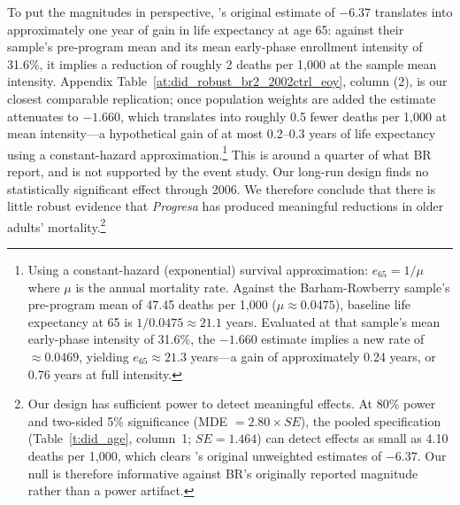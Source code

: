 \documentclass[12pt]{article}
\begin{document}
\p To put the magnitudes in perspective, \cite{BarhamRowberry2013JDE}'s original estimate of $-6.37$ translates into approximately one year of gain in life expectancy at age 65: against their sample's pre-program mean and its mean early-phase enrollment intensity of 31.6\%, it implies a reduction of roughly 2 deaths per 1,000 at the sample mean intensity. Appendix Table~\ref{at:did_robust_br2_2002ctrl_eoy}, column (2), is our closest comparable replication; once population weights are added the estimate attenuates to $-1.660$, which translates into roughly 0.5 fewer deaths per 1,000 at mean intensity—a hypothetical gain of at most 0.2--0.3 years of life expectancy using a constant-hazard approximation.\footnote{Using a constant-hazard (exponential) survival approximation: $e_{65} = 1/\mu$ where $\mu$ is the annual mortality rate. Against the Barham-Rowberry sample's pre-program mean of 47.45 deaths per 1,000 ($\mu \approx 0.0475$), baseline life expectancy at 65 is $1/0.0475 \approx 21.1$ years. Evaluated at that sample's mean early-phase intensity of 31.6\%, the $-1.660$ estimate implies a new rate of $\approx 0.0469$, yielding $e_{65} \approx 21.3$ years—a gain of approximately 0.24 years, or 0.76 years at full intensity.} This is around a quarter of what BR report, and is not supported by the event study. Our long-run design finds no statistically significant effect through 2006. We therefore conclude that there is little robust evidence that \textit{Progresa} has produced meaningful reductions in older adults' mortality.\footnote{Our design has sufficient power to detect meaningful effects. At 80\% power and two-sided 5\% significance (MDE $=2.80\times SE$), the pooled specification (Table~\ref{t:did_age}, column~1; $SE=1.464$) can detect effects as small as 4.10 deaths per 1,000, which clears \cite{BarhamRowberry2013JDE}'s original unweighted estimates of $-6.37$. Our null is therefore informative against BR's originally reported magnitude rather than a power artifact.} 

\end{document}
